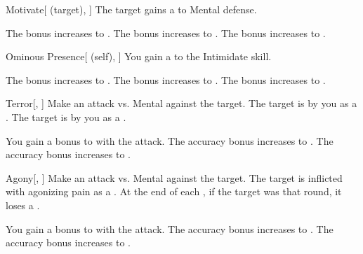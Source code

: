 \lowercase{\hypertarget{spell:Motivate}{}}\label{spell:Motivate}
\begin{attuneability}[Rank 1]{\hypertarget{spell:Motivate}{Motivate}}[ (target), ]
The target gains a   to Mental defense.

\rankline
{} The bonus increases to .
 The bonus increases to .
 The bonus increases to .
\end{attuneability}
\vspace{0.25em}



\lowercase{\hypertarget{spell:Ominous Presence}{}}\label{spell:Ominous Presence}
\begin{attuneability}[Rank 1]{\hypertarget{spell:Ominous Presence}{Ominous Presence}}[ (self), ]
You gain a   to the Intimidate skill.

\rankline
{} The bonus increases to .
 The bonus increases to .
 The bonus increases to .
\end{attuneability}
\vspace{0.25em}



\lowercase{\hypertarget{spell:Terror}{}}\label{spell:Terror}
\begin{freeability}[Rank 1]{\hypertarget{spell:Terror}{Terror}}[, ]
Make an attack vs. Mental against the target.
\hit The target is \shaken by you as a .
\crit The target is  by you as a .

\rankline
{} You gain a  bonus to  with the attack.
 The accuracy bonus increases to .
 The accuracy bonus increases to .
\end{freeability}
\vspace{0.25em}



\lowercase{\hypertarget{spell:Agony}{}}\label{spell:Agony}
\begin{freeability}[Rank 2]{\hypertarget{spell:Agony}{Agony}}[, ]
Make an attack vs. Mental against the target.
\hit The target is inflicted with agonizing pain as a .
At the end of each , if the target was  that round, it loses a .

\rankline
{} You gain a  bonus to  with the attack.
 The accuracy bonus increases to .
 The accuracy bonus increases to .
\end{freeability}
\vspace{0.25em}



